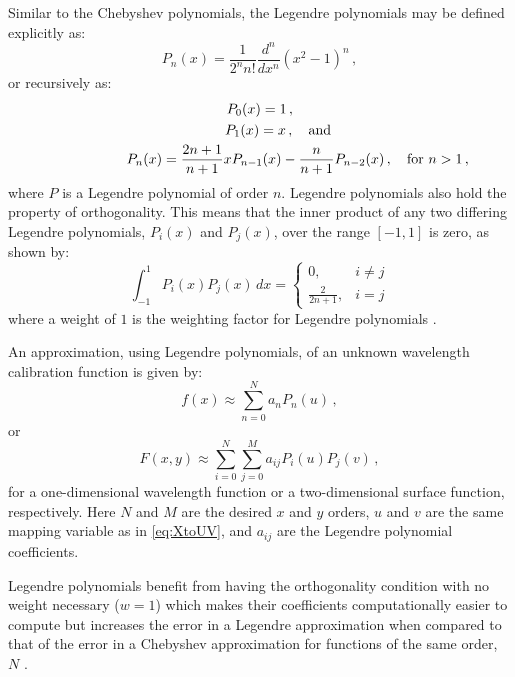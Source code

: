 Similar to the Chebyshev polynomials, the Legendre polynomials may be defined explicitly as:
\begin{equation}
    P_{n}(x) = \frac{1}{2^{n} n!} \frac{d^{n}}{d x^{n}} (x^{2} - 1)^{n}\,,\label{eq:legpolyexplicit}
\end{equation}
or recursively as:
\begin{equation}
    \begin{gathered}
        P_{0}(x) = 1\,,\\
        P_{1}(x) = x\,,\rlap{\quad and}\\
        P_{n}(x) = \frac{2 n + 1}{n + 1} x P_{n - 1}(x) - \frac{n}{n + 1} P_{n - 2}(x)\,,\rlap{\quad for $n > 1$\,,}
    \end{gathered}\label{eq:legpoly}
\end{equation}
where $P$ is a Legendre polynomial of order $n$. Legendre polynomials also hold the property of orthogonality. This means that the inner product of any two differing Legendre polynomials, $P_{i}(x)$ and $P_{j}(x)$, over the range $[-1, 1]$ is zero, as shown by:
\begin{equation}
    \int_{-1}^{1} P_{i}(x) P_{j}(x) \,dx =
    \begin{cases}
        0,                 & i \neq j \\
        \frac{2}{2 n + 1}, & i = j
    \end{cases}\label{eq:legorth}
\end{equation}
where a weight of $1$ is the weighting factor for Legendre polynomials \citep{numerical_recipes, leg}.

An approximation, using Legendre polynomials, of an unknown wavelength calibration function is given by:
\begin{equation}
    f(x) \approx \sum_{n = 0}^{N} a_{n} P_{n}(u)\,,\label{eq:legendre}
\end{equation}
or
\begin{equation}
    F(x, y) \approx \sum_{i = 0}^{N} \sum_{j = 0}^{M} a_{ij} P_{i}(u) P_{j}(v)\,,\label{eq:Legendre2D}
\end{equation}
for a one-dimensional wavelength function or a two-dimensional surface function, respectively. Here $N$ and $M$ are the desired $x$ and $y$ orders, $u$ and $v$ are the same mapping variable as in \autoref{eq:XtoUV}, and $a_{ij}$ are the Legendre polynomial coefficients.

Legendre polynomials benefit from having the orthogonality condition with no weight necessary ($w = 1$) which makes their coefficients computationally easier to compute but increases the error in a Legendre approximation when compared to that of the error in a Chebyshev approximation for functions of the same order, $N$ \citep{leg_cheb_relation}.

